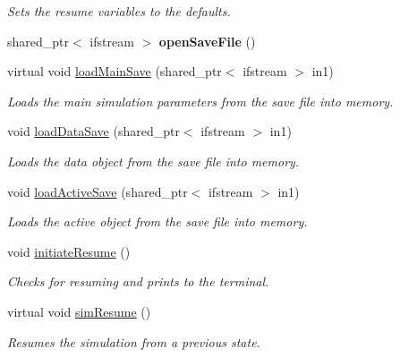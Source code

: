\begin{DoxyCompactItemize}
\begin{DoxyCompactList}\small\item\em Sets the resume variables to the defaults. \end{DoxyCompactList}\item 
shared\+\_\+ptr$<$ ifstream $>$ {\bfseries open\+Save\+File} ()\hypertarget{class_tree_acc6cbb7b0ac50a003a5e64ec3e37e3c0}{}\label{class_tree_acc6cbb7b0ac50a003a5e64ec3e37e3c0}

\item 
virtual void \hyperlink{class_tree_a7f40faa0cd2c61d9acfa0915bdeecffe}{load\+Main\+Save} (shared\+\_\+ptr$<$ ifstream $>$ in1)\hypertarget{class_tree_a7f40faa0cd2c61d9acfa0915bdeecffe}{}\label{class_tree_a7f40faa0cd2c61d9acfa0915bdeecffe}

\begin{DoxyCompactList}\small\item\em Loads the main simulation parameters from the save file into memory. \end{DoxyCompactList}\item 
void \hyperlink{class_tree_a65e6b9229e919776512518ebd5f91660}{load\+Data\+Save} (shared\+\_\+ptr$<$ ifstream $>$ in1)\hypertarget{class_tree_a65e6b9229e919776512518ebd5f91660}{}\label{class_tree_a65e6b9229e919776512518ebd5f91660}

\begin{DoxyCompactList}\small\item\em Loads the data object from the save file into memory. \end{DoxyCompactList}\item 
void \hyperlink{class_tree_adb4f5a02e428b1c0652f30e8aac3ea7f}{load\+Active\+Save} (shared\+\_\+ptr$<$ ifstream $>$ in1)\hypertarget{class_tree_adb4f5a02e428b1c0652f30e8aac3ea7f}{}\label{class_tree_adb4f5a02e428b1c0652f30e8aac3ea7f}

\begin{DoxyCompactList}\small\item\em Loads the active object from the save file into memory. \end{DoxyCompactList}\item 
void \hyperlink{class_tree_a8cfe5d30d53d702f18cd67981e2c9acb}{initiate\+Resume} ()\hypertarget{class_tree_a8cfe5d30d53d702f18cd67981e2c9acb}{}\label{class_tree_a8cfe5d30d53d702f18cd67981e2c9acb}

\begin{DoxyCompactList}\small\item\em Checks for resuming and prints to the terminal. \end{DoxyCompactList}\item 
virtual void \hyperlink{class_tree_a3d614f3848dc7acab168642efe345569}{sim\+Resume} ()
\begin{DoxyCompactList}\small\item\em Resumes the simulation from a previous state. \end{DoxyCompactList}\end{DoxyCompactItemize}
